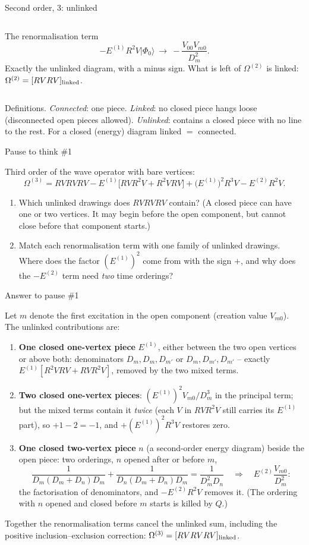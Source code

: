 \documentclass[aspectratio=169,10pt]{beamer}
\newcounter{thinkctr}
\newcommand{\thinkq}[2]{%
  \stepcounter{thinkctr}%
  \vfill
  \begin{tcolorbox}[enhanced,colback=palewarm,colframe=warm,boxrule=1.2pt,arc=4pt,
    grow to left by=6mm,grow to right by=6mm,
    left=16pt,right=16pt,top=16pt,bottom=18pt,
    fonttitle=\bfseries\Large,fontupper=\Large,
    title={Pause to think \#\thethinkctr\hfill\mdseries\normalsize(about #1 min -- discuss with your neighbour)}]
  #2
  \end{tcolorbox}
  \vfill}
\newcommand{\thinka}[1]{%
  \vfill
  \begin{tcolorbox}[enhanced,colback=paleteal,colframe=teal,boxrule=1.2pt,arc=4pt,
    grow to left by=6mm,grow to right by=6mm,
    left=16pt,right=16pt,top=16pt,bottom=18pt,
    fonttitle=\bfseries\Large,fontupper=\large,
    title={Answer to pause \#\thethinkctr}]
  #1
  \end{tcolorbox}
  \vfill}
\newcommand{\ket}[1]{\vert #1\rangle}
\newcommand{\ph}{\Phi_0}
\begin{document}
\begin{frame}{Second order, 3: unlinked}
\begin{columns}[T]
\begin{block}{The renormalisation term}
\[
-E^{(1)}R^2V\ket{\ph}\ \to\ -\frac{V_{00}V_{m0}}{D_m^2}.
\]
\alert{Exactly the unlinked diagram, with a minus sign.} What is left of $\Omega^{(2)}$ is linked: $\Omega^{(2)}=[RVRV]_{\rm linked}$.
\end{block}
\end{columns}
\vspace{0em}
\small Definitions. \emph{Connected}: one piece. \emph{Linked}: no closed piece hangs loose (disconnected open pieces allowed). \emph{Unlinked}: contains a closed piece with no line to the rest. For a closed (energy) diagram linked $=$ connected.
\end{frame}

\begin{frame}{Pause to think \#1}
\thinkq{4}{\normalsize Third order of the wave operator with bare vertices:
\[
\Omega^{(3)}=RVRVRV-E^{(1)}\bigl[RVR^2V+R^2VRV\bigr]+\bigl(E^{(1)}\bigr)^2R^3V-E^{(2)}R^2V.
\]
\begin{enumerate}
\item Which unlinked drawings does $RVRVRV$ contain? (A closed piece can have one or two vertices. It may begin before the open component, but cannot close before that component starts.)
\item Match each renormalisation term with one family of unlinked drawings. Where does the factor $(E^{(1)})^2$ come from with the sign $+$, and why does the $-E^{(2)}$ term need \emph{two} time orderings?
\end{enumerate}}
\end{frame}

\begin{frame}{Answer to pause \#1}
\thinka{\footnotesize%
Let $m$ denote the first excitation in the open component (creation value $V_{m0}$). The unlinked contributions are:
\begin{enumerate}
\item \textbf{One closed one-vertex piece} $E^{(1)}$, either between the two open vertices or above both: denominators $D_m,D_m,D_{m'}$ or $D_m,D_{m'},D_{m'}$ -- exactly $E^{(1)}[R^2VRV+RVR^2V]$, removed by the two mixed terms.
\item \textbf{Two closed one-vertex pieces}: $(E^{(1)})^2V_{m0}/D_m^3$ in the principal term; but the mixed terms contain it \emph{twice} (each $V$ in $RVR^2V$ still carries its $E^{(1)}$ part), so $+1-2=-1$, and $+(E^{(1)})^2R^3V$ restores zero.
\item \textbf{One closed two-vertex piece} $n$ (a second-order energy diagram) beside the open piece: two orderings, $n$ opened after or before $m$,
\[
\frac{1}{D_m(D_m+D_n)D_m}+\frac{1}{D_n(D_m+D_n)D_m}=\frac{1}{D_m^2D_n}
\quad\Longrightarrow\quad E^{(2)}\frac{V_{m0}}{D_m^2}:
\]
\alert{the factorisation of denominators}, and $-E^{(2)}R^2V$ removes it. (The ordering with $n$ opened and closed before $m$ starts is killed by $Q$.)
\end{enumerate}
Together the renormalisation terms cancel the unlinked sum, including the positive inclusion--exclusion correction: $\Omega^{(3)}=[RVRVRV]_{\rm linked}$.}
\end{frame}
\end{document}

